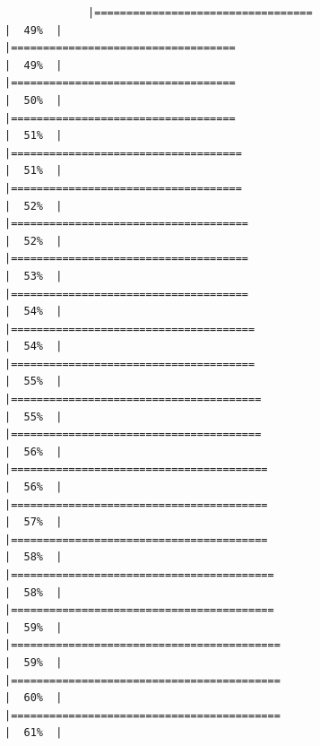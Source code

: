 \documentclass[
]{article}
\begin{document}
\begin{verbatim}
             |==================================                                    |  49%  |                                                                              |===================================                                   |  49%  |                                                                              |===================================                                   |  50%  |                                                                              |===================================                                   |  51%  |                                                                              |====================================                                  |  51%  |                                                                              |====================================                                  |  52%  |                                                                              |=====================================                                 |  52%  |                                                                              |=====================================                                 |  53%  |                                                                              |=====================================                                 |  54%  |                                                                              |======================================                                |  54%  |                                                                              |======================================                                |  55%  |                                                                              |=======================================                               |  55%  |                                                                              |=======================================                               |  56%  |                                                                              |========================================                              |  56%  |                                                                              |========================================                              |  57%  |                                                                              |========================================                              |  58%  |                                                                              |=========================================                             |  58%  |                                                                              |=========================================                             |  59%  |                                                                              |==========================================                            |  59%  |                                                                              |==========================================                            |  60%  |                                                                              |==========================================                            |  61%  |                                                                  
\end{verbatim}
\end{document}
